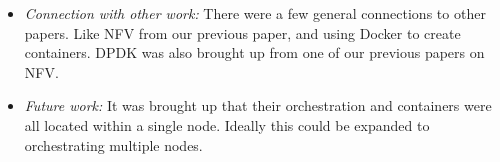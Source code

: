 \documentclass[letterpaper,twocolumn,10pt]{article}
\begin{document}
\begin{itemize}
\item {\it Connection with other work:} 
There were a few general connections to other papers. Like NFV from our previous paper, and using Docker
to create containers. DPDK was also brought up from one of our previous papers on NFV.

\item {\it Future work:} 
It was brought up that their orchestration and containers were all located within a single node. Ideally this could be
expanded to orchestrating multiple nodes.

\end{itemize}
\end{document}

